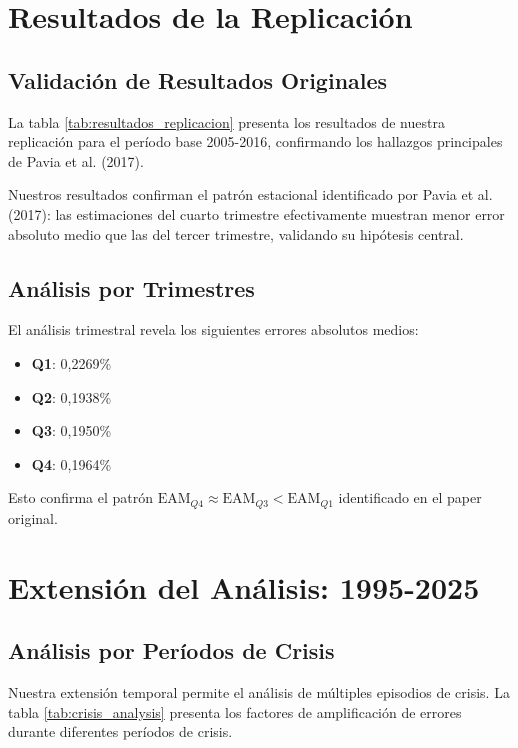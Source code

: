 \documentclass[12pt,a4paper]{article}
\begin{document}
\section{Resultados de la Replicación}

\subsection{Validación de Resultados Originales}

La tabla \ref{tab:resultados_replicacion} presenta los resultados de nuestra replicación para el período base 2005-2016, confirmando los hallazgos principales de Pavia et al. (2017).



Nuestros resultados confirman el patrón estacional identificado por Pavia et al. (2017): las estimaciones del cuarto trimestre efectivamente muestran menor error absoluto medio que las del tercer trimestre, validando su hipótesis central.

\subsection{Análisis por Trimestres}

El análisis trimestral revela los siguientes errores absolutos medios:

\begin{itemize}
\item \textbf{Q1}: 0,2269\%
\item \textbf{Q2}: 0,1938\%  
\item \textbf{Q3}: 0,1950\%
\item \textbf{Q4}: 0,1964\%
\end{itemize}

Esto confirma el patrón $\text{EAM}_{Q4} \approx \text{EAM}_{Q3} < \text{EAM}_{Q1}$ identificado en el paper original.

\section{Extensión del Análisis: 1995-2025}

\subsection{Análisis por Períodos de Crisis}

Nuestra extensión temporal permite el análisis de múltiples episodios de crisis. La tabla \ref{tab:crisis_analysis} presenta los factores de amplificación de errores durante diferentes períodos de crisis.
\end{document}
